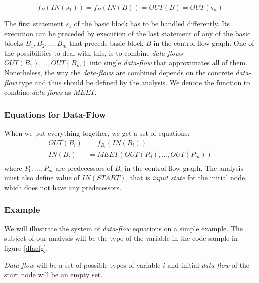         \[ f_B(IN(s_1))=f_B(IN(B))=OUT(B)=OUT(s_n) \]
        
        The first statement $s_1$ of the basic block has to be 
        handled differently. Its execution can be preceded by 
        execution of the last statement of any of 
        the basic blocks $B_1, B_2, ..., B_m$ that precede basic block 
        $B$ in the control flow graph. One of the possibilities to deal with 
        this, is to combine \emph{data-flows} $OUT(B_1), ..., OUT(B_m)$ into 
        single \emph{data-flow} that approximates all of them. 
        Nonetheless, the way the \emph{data-flows} are combined depends 
        on the concrete \emph{data-flow} type and thus 
        should be defined by the analysis. We denote the function to 
        combine \emph{data-flows} as $\mathit{MEET}$. 
        
        \subsubsection*{Equations for Data-Flow}
        
        When we put everything together, we get a set of equations:
        \begin{align*}
            OUT(B_i) &= f_{B_i}(IN(B_i)) \\
            IN(B_i) &= \mathit{MEET}(OUT(P_0), ..., OUT(P_m)) \\ 
        \end{align*}
        where $P_0, ..., P_m$ are predecessors of $B_i$ in the 
        control flow graph. The analysis must also define value 
        of $IN(START)$, that is \emph{input state} for the 
        initial node, which does not have any predecessors.
        
        \subsubsection*{Example}
        We will illustrate the system of \emph{data-flow} equations on a 
        simple example. The subject of our analysis will be the 
        type of the variable  in the code sample in figure \ref{dfacfg}.
        
        \emph{Data-flow} will be a set of possible types of variable $i$ and 
        initial \emph{data-flow} of the start node will be an empty set.

